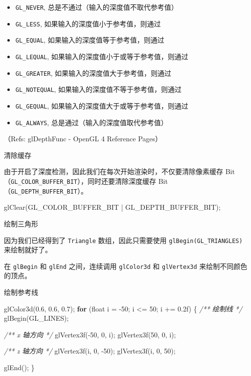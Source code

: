 \documentclass[
]{article}
\newenvironment{Shaded}{}{}
\newcommand{\BuiltInTok}[1]{#1}
\newcommand{\CommentTok}[1]{\textcolor[rgb]{0.38,0.63,0.69}{\textit{#1}}}
\newcommand{\ControlFlowTok}[1]{\textcolor[rgb]{0.00,0.44,0.13}{\textbf{#1}}}
\newcommand{\DataTypeTok}[1]{\textcolor[rgb]{0.56,0.13,0.00}{#1}}
\newcommand{\DecValTok}[1]{\textcolor[rgb]{0.25,0.63,0.44}{#1}}
\newcommand{\FloatTok}[1]{\textcolor[rgb]{0.25,0.63,0.44}{#1}}
\newcommand{\NormalTok}[1]{#1}
\begin{document}
\begin{itemize}
\item
  \texttt{GL\_NEVER}, 总是不通过（输入的深度值不取代参考值）
\item
  \texttt{GL\_LESS}, 如果输入的深度值小于参考值，则通过
\item
  \texttt{GL\_EQUAL}, 如果输入的深度值等于参考值，则通过
\item
  \texttt{GL\_LEQUAL}, 如果输入的深度值小于或等于参考值，则通过
\item
  \texttt{GL\_GREATER}, 如果输入的深度值大于参考值，则通过
\item
  \texttt{GL\_NOTEQUAL}, 如果输入的深度值不等于参考值，则通过
\item
  \texttt{GL\_GEQUAL}, 如果输入的深度值大于或等于参考值，则通过
\item
  \texttt{GL\_ALWAYS}, 总是通过（输入的深度值取代参考值）
\end{itemize}

（Refs: glDepthFunc - OpenGL 4 Reference Pages）

清除缓存

由于开启了深度检测，因此我们在每次开始渲染时，不仅要清除像素缓存
Bit（\texttt{GL\_COLOR\_BUFFER\_BIT}），同时还要清除深度缓存
Bit（\texttt{GL\_DEPTH\_BUFFER\_BIT}）。

\begin{Shaded}
\begin{Highlighting}[]
\NormalTok{glClear(GL_COLOR_BUFFER_BIT | GL_DEPTH_BUFFER_BIT);}
\end{Highlighting}
\end{Shaded}

绘制三角形

因为我们已经得到了 \texttt{Triangle} 数组，因此只需要使用
\texttt{glBegin(GL\_TRIANGLES)} 来绘制就好了。

在 \texttt{glBegin} 和 \texttt{glEnd} 之间，连续调用 \texttt{glColor3d}
和 \texttt{glVertex3d} 来绘制不同颜色的顶点。

绘制参考线

\begin{Shaded}
\begin{Highlighting}[]
\NormalTok{glColor3d(}\FloatTok{0.6}\NormalTok{, }\FloatTok{0.6}\NormalTok{, }\FloatTok{0.7}\NormalTok{);}
\ControlFlowTok{for}\NormalTok{ (}\DataTypeTok{float}\NormalTok{ i = -}\DecValTok{50}\NormalTok{; i <= }\DecValTok{50}\NormalTok{; i += }\FloatTok{0.2}\BuiltInTok{f}\NormalTok{)}
\NormalTok{\{}
	\CommentTok{/** 绘制线 */}
\NormalTok{	glBegin(GL_LINES);}

	\CommentTok{/** x 轴方向 */}
\NormalTok{	glVertex3f(-}\DecValTok{50}\NormalTok{, }\DecValTok{0}\NormalTok{, i);}
\NormalTok{	glVertex3f(}\DecValTok{50}\NormalTok{, }\DecValTok{0}\NormalTok{, i);}

	\CommentTok{/** z 轴方向 */}
\NormalTok{	glVertex3f(i, }\DecValTok{0}\NormalTok{, -}\DecValTok{50}\NormalTok{);}
\NormalTok{	glVertex3f(i, }\DecValTok{0}\NormalTok{, }\DecValTok{50}\NormalTok{);}

\NormalTok{	glEnd();}
\NormalTok{\}}
\end{Highlighting}
\end{Shaded}
\end{document}
